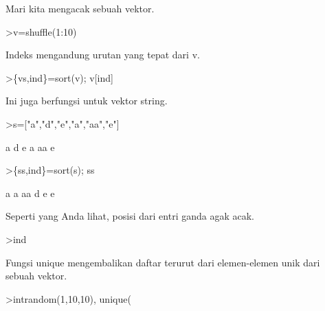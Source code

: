 \documentclass[12pt,arial,letterpaper]{book}
\begin{document}
\begin{eulercomment}
\begin{eulercomment}
\begin{eulercomment}
\begin{eulercomment}
\begin{eulercomment}
\begin{eulercomment}
\begin{eulercomment}
\begin{eulercomment}
\begin{eulercomment}
Mari kita mengacak sebuah vektor.
\end{eulercomment}
\begin{eulerprompt}
>v=shuffle(1:10)
\end{eulerprompt}
\begin{euleroutput}
  [5,  9,  10,  1,  3,  8,  7,  4,  6,  2]
\end{euleroutput}
\begin{eulercomment}
Indeks mengandung urutan yang tepat dari v.
\end{eulercomment}
\begin{eulerprompt}
>\{vs,ind\}=sort(v); v[ind]
\end{eulerprompt}
\begin{euleroutput}
  [1,  2,  3,  4,  5,  6,  7,  8,  9,  10]
\end{euleroutput}
\begin{eulercomment}
Ini juga berfungsi untuk vektor string.
\end{eulercomment}
\begin{eulerprompt}
>s=["a","d","e","a","aa","e"]
\end{eulerprompt}
\begin{euleroutput}
  a
  d
  e
  a
  aa
  e
\end{euleroutput}
\begin{eulerprompt}
>\{ss,ind\}=sort(s); ss
\end{eulerprompt}
\begin{euleroutput}
  a
  a
  aa
  d
  e
  e
\end{euleroutput}
\begin{eulercomment}
Seperti yang Anda lihat, posisi dari entri ganda agak acak.
\end{eulercomment}
\begin{eulerprompt}
>ind
\end{eulerprompt}
\begin{euleroutput}
  [4,  1,  5,  2,  6,  3]
\end{euleroutput}
\begin{eulercomment}
Fungsi unique mengembalikan daftar terurut dari elemen-elemen unik
dari sebuah vektor.
\end{eulercomment}
\begin{eulerprompt}
>intrandom(1,10,10), unique(%
\end{eulerprompt}
\begin{euleroutput}
  [5,  8,  5,  2,  7,  10,  4,  4,  2,  1]
  [1,  2,  4,  5,  7,  8,  10]
\end{euleroutput}
\begin{eulercomment}

\end{eulercomment}
\end{eulercomment}
\end{eulercomment}
\end{eulercomment}
\end{eulercomment}
\end{eulercomment}
\end{eulercomment}
\end{eulercomment}
\end{eulercomment}
\end{document}
